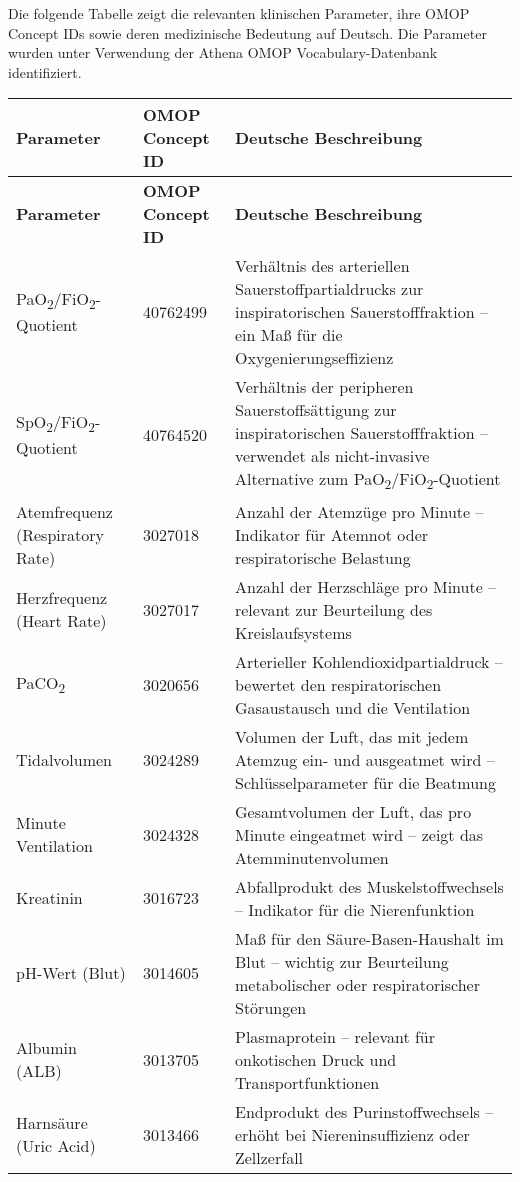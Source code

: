 \documentclass[12pt]{article}
\begin{document}
Die folgende Tabelle zeigt die relevanten klinischen Parameter, ihre OMOP Concept IDs sowie deren medizinische Bedeutung auf Deutsch. Die Parameter wurden unter Verwendung der Athena OMOP Vocabulary-Datenbank identifiziert.

\begin{longtable}{|p{5cm}|p{3.5cm}|p{7.5cm}|}
\hline
\textbf{Parameter} & \textbf{OMOP Concept ID} & \textbf{Deutsche Beschreibung} \\
\hline
\endfirsthead
\hline
\textbf{Parameter} & \textbf{OMOP Concept ID} & \textbf{Deutsche Beschreibung} \\
\hline
\endhead
PaO\textsubscript{2}/FiO\textsubscript{2}-Quotient & 40762499 & Verhältnis des arteriellen Sauerstoffpartialdrucks zur inspiratorischen Sauerstofffraktion – ein Maß für die Oxygenierungseffizienz \\
\hline
SpO\textsubscript{2}/FiO\textsubscript{2}-Quotient & 40764520 & Verhältnis der peripheren Sauerstoffsättigung zur inspiratorischen Sauerstofffraktion – verwendet als nicht-invasive Alternative zum PaO\textsubscript{2}/FiO\textsubscript{2}-Quotient \\
\hline
Atemfrequenz (Respiratory Rate) & 3027018 & Anzahl der Atemzüge pro Minute – Indikator für Atemnot oder respiratorische Belastung \\
\hline
Herzfrequenz (Heart Rate) & 3027017 & Anzahl der Herzschläge pro Minute – relevant zur Beurteilung des Kreislaufsystems \\
\hline
PaCO\textsubscript{2} & 3020656 & Arterieller Kohlendioxidpartialdruck – bewertet den respiratorischen Gasaustausch und die Ventilation \\
\hline
Tidalvolumen & 3024289 & Volumen der Luft, das mit jedem Atemzug ein- und ausgeatmet wird – Schlüsselparameter für die Beatmung \\
\hline
Minute Ventilation & 3024328 & Gesamtvolumen der Luft, das pro Minute eingeatmet wird – zeigt das Atemminutenvolumen \\
\hline
Kreatinin & 3016723 & Abfallprodukt des Muskelstoffwechsels – Indikator für die Nierenfunktion \\
\hline
pH-Wert (Blut) & 3014605 & Maß für den Säure-Basen-Haushalt im Blut – wichtig zur Beurteilung metabolischer oder respiratorischer Störungen \\
\hline
Albumin (ALB) & 3013705 & Plasmaprotein – relevant für onkotischen Druck und Transportfunktionen \\
\hline
Harnsäure (Uric Acid) & 3013466 & Endprodukt des Purinstoffwechsels – erhöht bei Niereninsuffizienz oder Zellzerfall \\

\end{longtable}
\end{document}
